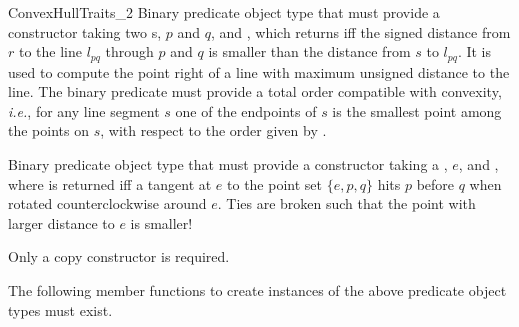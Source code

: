 \begin{ccRefConcept}{ConvexHullTraits_2}
%
       {Binary predicate object type that must provide a constructor taking
        two s, $p$ and $q$, and
        , which returns  iff
        the signed distance from $r$ to the line $l_{pq}$ through $p$ and $q$
        is smaller than the distance from $s$ to $l_{pq}$. It is used to
        compute the point right of a line with maximum unsigned distance to
        the line. The binary predicate must provide a total order compatible
        with convexity, {\it i.e.}, for any line segment $s$ one of the 
        endpoints 
        of $s$ is the smallest point among the points on $s$, with respect to
        the order given by .}

%
       {Binary predicate object type that must provide a constructor taking a
        , $e$, and ,
        where  is returned iff a tangent at $e$ to the point set
        $\{e,p,q\}$ hits $p$ before $q$ when rotated counterclockwise around 
        $e$.
        Ties are broken such that the point with larger distance to $e$
        is smaller!}


\ccCreation
{}  %

Only a copy constructor is required.


\ccOperations

The following member functions to create instances of the above predicate
object types must exist. 

\setlength\parskip{0mm}
\ccGlue
{}
\ccGlue
{}
\ccGlue
{}
\ccGlue
{}
\ccGlue
{}


\ccParDims
\ccHasModels

 \\
 \\
 \\
 \\
 \\
 \\
 \\
\ccAutoIndexingOn


\end{ccRefConcept}
